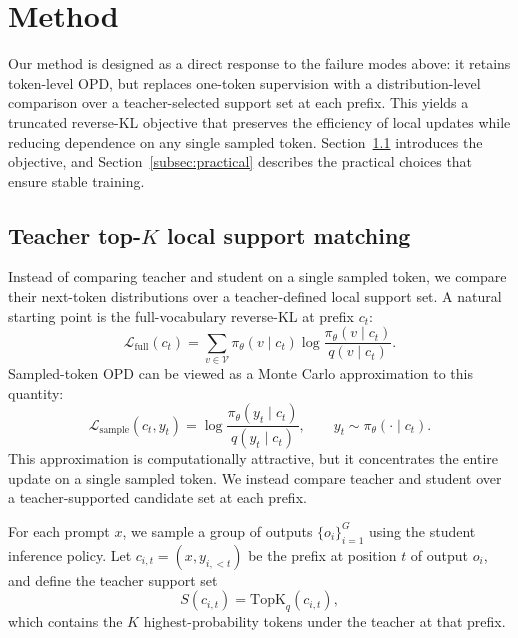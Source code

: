 \documentclass{article}
\begin{document}
\section{Method}
\label{sec:method}
Our method is designed as a direct response to the failure modes above: it retains token-level OPD, but replaces one-token supervision with a distribution-level comparison over a teacher-selected support set at each prefix.
This yields a truncated reverse-KL objective that preserves the efficiency of local updates while reducing dependence on any single sampled token.
Section~\ref{subsec:topk_method} introduces the objective, and Section~\ref{subsec:practical} describes the practical choices that ensure stable training.
\subsection{Teacher top-\texorpdfstring{$K$}{K} local support matching}
\label{subsec:topk_method}
Instead of comparing teacher and student on a single sampled token, we compare their next-token distributions over a teacher-defined local support set. A natural starting point is the full-vocabulary reverse-KL at prefix $c_t$:
\begin{equation}
\mathcal{L}_{\mathrm{full}}(c_t)
=
\sum_{v \in \mathcal{V}}
\pi_\theta(v \mid c_t)
\log \frac{\pi_\theta(v \mid c_t)}{q(v \mid c_t)}.
\label{eq:full_local_rkl}
\end{equation}
Sampled-token OPD can be viewed as a Monte Carlo approximation to this quantity:
\begin{equation}
\mathcal{L}_{\mathrm{sample}}(c_t, y_t)
=
\log \frac{\pi_\theta(y_t \mid c_t)}{q(y_t \mid c_t)},
\qquad
y_t \sim \pi_\theta(\cdot \mid c_t).
\label{eq:sample_local_rkl}
\end{equation}
This approximation is computationally attractive, but it concentrates the entire update on a single sampled token. We instead compare teacher and student over a teacher-supported candidate set at each prefix.

For each prompt $x$, we sample a group of outputs $\{o_i\}_{i=1}^{G}$ using the student inference policy. Let $c_{i,t} = (x, y_{i,<t})$ be the prefix at position $t$ of output $o_i$, and define the teacher support set
\begin{equation}
S(c_{i,t}) = \mathrm{TopK}_q(c_{i,t}),
\label{eq:topk_support}
\end{equation}
which contains the $K$ highest-probability tokens under the teacher at that prefix.
\end{document}
